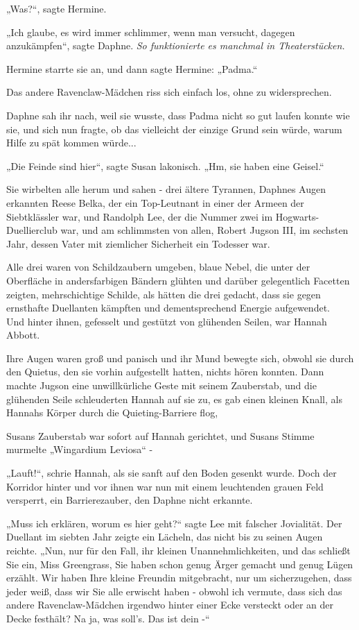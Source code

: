 {„Was?“, sagte Hermine.

„Ich glaube, es wird immer schlimmer, wenn man versucht, dagegen anzukämpfen“, sagte Daphne. \emph{So funktionierte es manchmal in Theaterstücken.}

Hermine starrte sie an, und dann sagte Hermine: „Padma.“

Das andere Ravenclaw-Mädchen riss sich einfach los, ohne zu widersprechen.

Daphne sah ihr nach, weil sie wusste, dass Padma nicht so gut laufen konnte wie sie, und sich nun fragte, ob das vielleicht der einzige Grund sein würde, warum Hilfe zu spät kommen würde...

„Die Feinde sind hier“, sagte Susan lakonisch. „Hm, sie haben eine Geisel.“

Sie wirbelten alle herum und sahen - drei ältere Tyrannen, Daphnes Augen erkannten Reese Belka, der ein Top-Leutnant in einer der Armeen der Siebtklässler war, und Randolph Lee, der die Nummer zwei im Hogwarts-Duellierclub war, und am schlimmsten von allen, Robert Jugson III, im sechsten Jahr, dessen Vater mit ziemlicher Sicherheit ein Todesser war.

Alle drei waren von Schildzaubern umgeben, blaue Nebel, die unter der Oberfläche in andersfarbigen Bändern glühten und darüber gelegentlich Facetten zeigten, mehrschichtige Schilde, als hätten die drei gedacht, dass sie gegen ernsthafte Duellanten kämpften und dementsprechend Energie aufgewendet.\\ Und hinter ihnen, gefesselt und gestützt von glühenden Seilen, war Hannah Abbott.

Ihre Augen waren groß und panisch und ihr Mund bewegte sich, obwohl sie durch den Quietus, den sie vorhin aufgestellt hatten, nichts hören konnten. Dann machte Jugson eine unwillkürliche Geste mit seinem Zauberstab, und die glühenden Seile schleuderten Hannah auf sie zu, es gab einen kleinen Knall, als Hannahs Körper durch die Quieting-Barriere flog,

Susans Zauberstab war sofort auf Hannah gerichtet, und Susans Stimme murmelte „Wingardium Leviosa“ -

„Lauft!“, schrie Hannah, als sie sanft auf den Boden gesenkt wurde. Doch der Korridor hinter und vor ihnen war nun mit einem leuchtenden grauen Feld versperrt, ein Barrierezauber, den Daphne nicht erkannte.

„Muss ich erklären, worum es hier geht?“ sagte Lee mit falscher Jovialität. Der Duellant im siebten Jahr zeigte ein Lächeln, das nicht bis zu seinen Augen reichte. „Nun, nur für den Fall, ihr kleinen Unannehmlichkeiten, und das schließt Sie ein, Miss Greengrass, Sie haben schon genug Ärger gemacht und genug Lügen erzählt. Wir haben Ihre kleine Freundin mitgebracht, nur um sicherzugehen, dass jeder weiß, dass wir Sie alle erwischt haben - obwohl ich vermute, dass sich das andere Ravenclaw-Mädchen irgendwo hinter einer Ecke versteckt oder an der Decke festhält? Na ja, was soll's. Das ist dein -“

}
